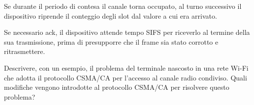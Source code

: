 \begin{questions}
\begin{solution}
        Se durante il periodo di contesa il canale torna occupato, al turno successivo il dispositivo riprende il conteggio degli slot dal valore a cui era arrivato.
        
        Se necessario ack, il dispositivo attende tempo SIFS per riceverlo al termine della sua trasmissione, prima di presupporre che il frame sia stato corrotto e ritrasmettere.
    \end{solution}
    
    \question Descrivere, con un esempio, il problema del terminale nascosto in una rete Wi-Fi che adotta il protocollo CSMA/CA per l'accesso al canale radio condiviso. Quali modifiche vengono introdotte al protocollo CSMA/CA per risolvere questo problema? 
    
    \begin{solution}
        
    \end{solution}
\end{questions}